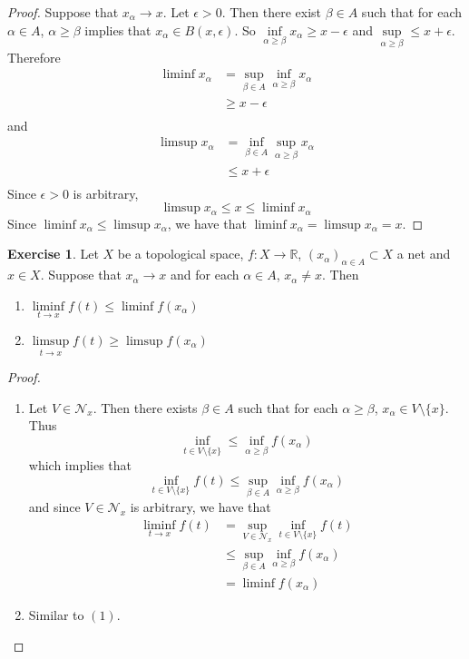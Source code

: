 \documentclass[12pt]{amsart}
\theoremstyle{definition}
\newtheorem{ex}[definition]{Exercise}
\newcommand{\al}{\alpha}
\newcommand{\be}{\beta}
\newcommand{\ep}{\epsilon}
\newcommand{\R}{\mathbb{R}}
\newcommand{\MN}{\mathcal{N}}
\begin{document}
	\begin{proof}
		Suppose that $x_{\al} \rightarrow x$. Let $\ep >0$. Then there exist $\beta \in A$ such that for each $\al \in A$, $\al \geq \beta$ implies that $x_{\al} \in B(x, \ep)$. So $\inf\limits_{\al \geq \beta} x_{\al} \geq x - \ep$ and $\sup\limits_{\al \geq \beta} \leq x + \ep$. Therefore 
		\begin{align*}
			\liminf x_{\al} 
			&= \sup_{\beta \in A} \inf_{\al \geq \be} x_{\al} \\
			& \geq x - \ep \\
		\end{align*}
		and 
		\begin{align*}
			\limsup x_{\al} 
			&= \inf_{\beta \in A} \sup_{\al \geq \be} x_{\al} \\
			& \leq x + \ep \\
		\end{align*}
		Since $\ep >0$ is arbitrary, $$\limsup x_{\al} \leq x \leq \liminf x_{\al}$$
		Since $\liminf x_{\al} \leq \limsup x_{\al}$, we have that $\liminf x_{\al} = \limsup x_{\al} = x$.
	\end{proof}
	

	\begin{ex}
		Let $X$ be a topological space, $f:X \rightarrow \R$, $(x_{\al})_{\al \in A} \subset X$ a net and $x \in X$. Suppose that $x_{\al} \rightarrow x$ and for each $\al \in A$, $x_{\al} \neq x$. Then 
		\begin{enumerate}
			\item $\liminf\limits_{t \rightarrow x} f(t) \leq \liminf f(x_{\al})$
			\item $\limsup\limits_{t \rightarrow x} f(t) \geq \limsup f(x_{\al})$
		\end{enumerate}
	\end{ex}

	\begin{proof}\
		\begin{enumerate}
			\item Let $V \in \MN_{x}$. Then there exists $\beta \in A$ such that for each $\al \geq \beta$, $x_{\al} \in V \setminus \{x\}$. Thus 
			$$\inf_{t \in V \setminus \{x\}} \leq \inf_{\al \geq \beta}f(x_{\al})$$
			which implies that $$\inf_{t \in V \setminus \{x\}} f(t)  \leq \sup_{\beta \in A} \inf_{\al \geq \beta} f(x_{\al})$$
			and since $V \in \MN_x$ is arbitrary, we have that
			\begin{align*}
				\liminf_{t \rightarrow x} f(t) 
				&= \sup_{V \in \MN_{x}} \inf_{t \in V \setminus \{x\}} f(t) \\
				& \leq \sup_{\beta \in A} \inf_{\al \geq \beta} f(x_{\al}) \\
				&= \liminf f(x_{\al})
			\end{align*} 
			\item Similar to $(1)$.
		\end{enumerate}
	\end{proof}
\end{document}
